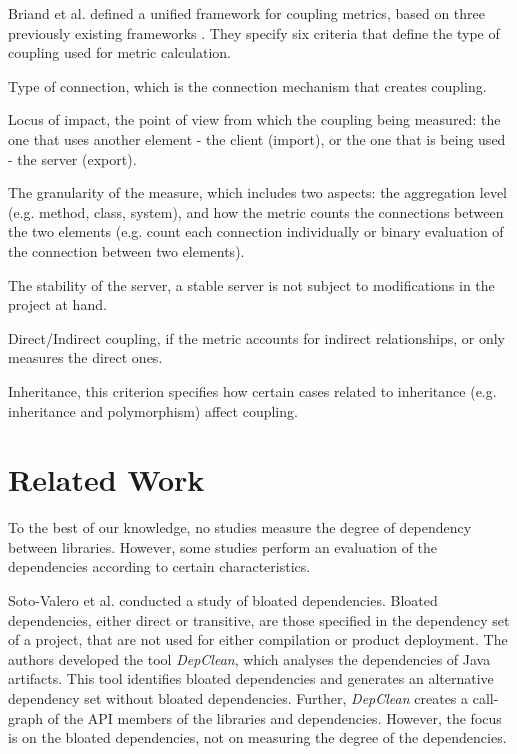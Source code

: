 \documentclass[a4paper]{article}
\begin{document}
Briand et al. \cite{briand1999unified} defined a unified framework for coupling metrics, based on three previously existing frameworks \cite{eder1994coupling,hitz1995measuring,briand1997investigation}. They specify six criteria that define the type of coupling used for metric calculation.

\begin{description}[noitemsep,leftmargin=*]
    \item [Criterion 1:] Type of connection, which is the connection mechanism that creates coupling.
    \item [Criterion 2:] Locus of impact, the point of view from which the coupling being measured: the one that uses another element - the client (import), or the one that is being used - the server (export).
    \item[Criterion 3:] The granularity of the measure, which includes two aspects: the aggregation level (e.g. method, class, system), and how the metric counts the connections between the two elements (e.g. count each connection individually or binary evaluation of the connection between two elements).
    \item [Criterion 4:] The stability of the server, a stable server is not subject to modifications in the project at hand.
    \item [Criterion 5:] Direct/Indirect coupling, if the metric accounts for indirect relationships, or only measures the direct ones.
    \item [Criterion 6:] Inheritance, this criterion specifies how certain cases related to inheritance (e.g. inheritance and polymorphism) affect coupling.
\end{description}

\section{Related Work}
To the best of our knowledge, no studies measure the degree of dependency between libraries. However, some studies perform an evaluation of the dependencies according to certain characteristics.

Soto-Valero et al. \cite{soto2020comprehensive} conducted a study of bloated dependencies. Bloated dependencies, either direct or transitive, are those specified in the dependency set of a project, that are not used for either compilation or product deployment. The authors developed the tool \textit{DepClean}, which analyses the dependencies of Java artifacts. This tool identifies bloated dependencies and generates an alternative dependency set without bloated dependencies. Further, \textit{DepClean} creates a call-graph of the API members of the libraries and dependencies. However, the focus is on the bloated dependencies, not on measuring the degree of the dependencies.
\end{document}
